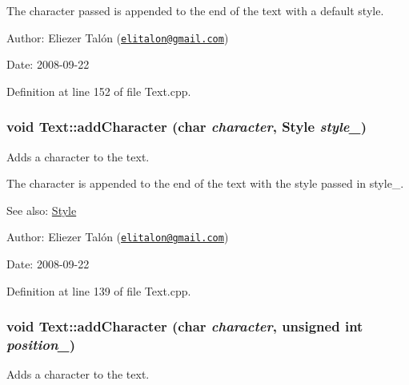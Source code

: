 The character passed is appended to the end of the text with a default style.

\begin{Desc}
\item[Author:]Eliezer Talón (\href{mailto:elitalon@gmail.com}{\tt elitalon@gmail.com}) \end{Desc}
\begin{Desc}
\item[Date:]2008-09-22 \end{Desc}


Definition at line 152 of file Text.cpp.\hypertarget{class_text_001de966164d34082a8712c145cebc66}{
\subsubsection[addCharacter]{\setlength{\rightskip}{0pt plus 5cm}void Text::addCharacter (char {\em character}, \/  {\bf Style} {\em style\_\-})}}
\label{class_text_001de966164d34082a8712c145cebc66}


Adds a character to the text. 

The character is appended to the end of the text with the style passed in style\_\-.

\begin{Desc}
\item[See also:]\hyperlink{class_style}{Style}\end{Desc}
\begin{Desc}
\item[Author:]Eliezer Talón (\href{mailto:elitalon@gmail.com}{\tt elitalon@gmail.com}) \end{Desc}
\begin{Desc}
\item[Date:]2008-09-22 \end{Desc}


Definition at line 139 of file Text.cpp.\hypertarget{class_text_52cb58f78952984e3d24cd80a0569219}{
\subsubsection[addCharacter]{\setlength{\rightskip}{0pt plus 5cm}void Text::addCharacter (char {\em character}, \/  unsigned int {\em position\_\-})}}
\label{class_text_52cb58f78952984e3d24cd80a0569219}


Adds a character to the text. 

